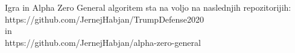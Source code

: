 \documentclass[a4paper, 12pt]{book}
\begin{document}
Igra in Alpha Zero General algoritem sta na voljo na naslednjih repozitorijih:\\
https://github.com/JernejHabjan/TrumpDefense2020\\
in \\ 
https://github.com/JernejHabjan/alpha-zero-general

\newpage %
\ \\
\clearpage
{}


\end{document}
